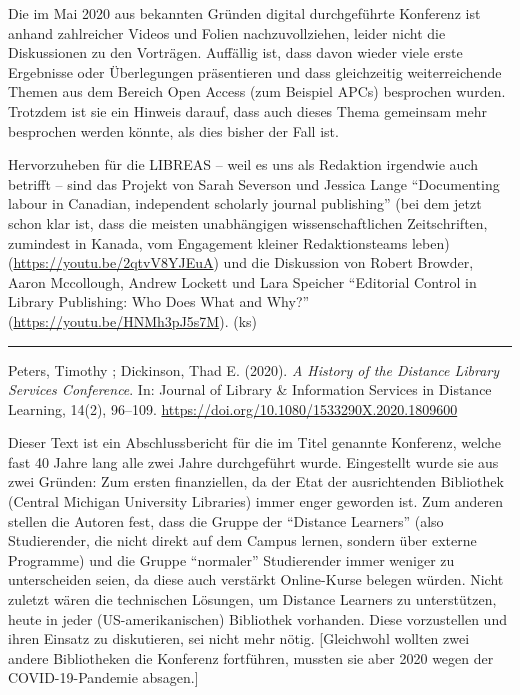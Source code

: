 \documentclass[a4paper,
fontsize=11pt,
oneside,
numbers=noperiodatend,
parskip=half-,
bibliography=totoc,
final
]{scrartcl}
\begin{document}
Die im Mai 2020 aus bekannten Gründen digital durchgeführte Konferenz
ist anhand zahlreicher Videos und Folien nachzuvollziehen, leider nicht
die Diskussionen zu den Vorträgen. Auffällig ist, dass davon wieder
viele erste Ergebnisse oder Überlegungen präsentieren und dass
gleichzeitig weiterreichende Themen aus dem Bereich Open Access (zum
Beispiel APCs) besprochen wurden. Trotzdem ist sie ein Hinweis darauf,
dass auch dieses Thema gemeinsam mehr besprochen werden könnte, als dies
bisher der Fall ist.

Hervorzuheben für die LIBREAS -- weil es uns als Redaktion irgendwie
auch betrifft -- sind das Projekt von Sarah Severson und Jessica Lange
\enquote{Documenting labour in Canadian, independent scholarly journal
publishing} (bei dem jetzt schon klar ist, dass die meisten unabhängigen
wissenschaftlichen Zeitschriften, zumindest in Kanada, vom Engagement
kleiner Redaktionsteams leben) (\url{https://youtu.be/2qtvV8YJEuA}) und
die Diskussion von Robert Browder, Aaron Mccollough, Andrew Lockett und
Lara Speicher \enquote{Editorial Control in Library Publishing: Who Does
What and Why?} (\url{https://youtu.be/HNMh3pJ5s7M}). (ks)

\begin{center}\rule{0.5\linewidth}{0.5pt}\end{center}

Peters, Timothy ; Dickinson, Thad E. (2020). \emph{A History of the
Distance Library Services Conference}. In: Journal of Library \&
Information Services in Distance Learning, 14(2), 96--109.
\url{https://doi.org/10.1080/1533290X.2020.1809600}

Dieser Text ist ein Abschlussbericht für die im Titel genannte
Konferenz, welche fast 40 Jahre lang alle zwei Jahre durchgeführt wurde.
Eingestellt wurde sie aus zwei Gründen: Zum ersten finanziellen, da der
Etat der ausrichtenden Bibliothek (Central Michigan University
Libraries) immer enger geworden ist. Zum anderen stellen die Autoren
fest, dass die Gruppe der \enquote{Distance Learners} (also
Studierender, die nicht direkt auf dem Campus lernen, sondern über
externe Programme) und die Gruppe \enquote{normaler} Studierender immer
weniger zu unterscheiden seien, da diese auch verstärkt Online-Kurse
belegen würden. Nicht zuletzt wären die technischen Lösungen, um
Distance Learners zu unterstützen, heute in jeder (US-amerikanischen)
Bibliothek vorhanden. Diese vorzustellen und ihren Einsatz zu
diskutieren, sei nicht mehr nötig. {[}Gleichwohl wollten zwei andere
Bibliotheken die Konferenz fortführen, mussten sie aber 2020 wegen der
COVID-19-Pandemie absagen.{]}
\end{document}
